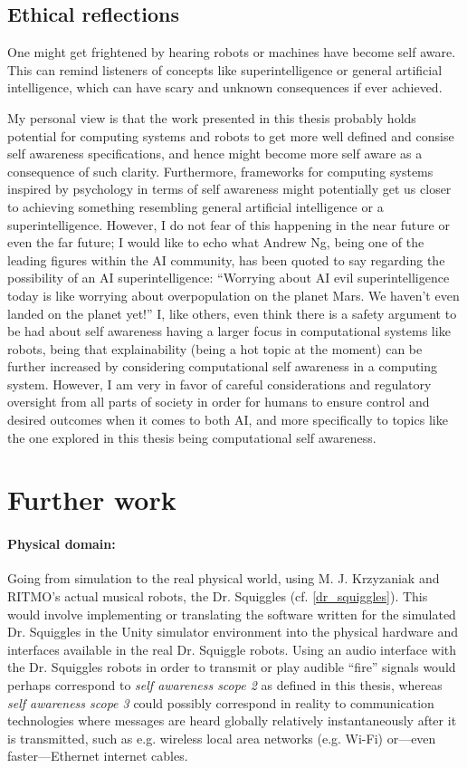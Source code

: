 	\subsection{Ethical reflections}
	
	One might get frightened by hearing robots or machines have become self aware. This can remind listeners of concepts like superintelligence or general artificial intelligence, which can have scary and unknown consequences if ever achieved.
	
	My personal view is that the work presented in this thesis probably holds potential for computing systems and robots to get more well defined and consise self awareness specifications, and hence might become more self aware as a consequence of such clarity. Furthermore, frameworks for computing systems inspired by psychology in terms of self awareness might potentially get us closer to achieving something resembling general artificial intelligence or a superintelligence. However, I do not fear of this happening in the near future or even the far future; I would like to echo what Andrew Ng, being one of the leading figures within the AI community, has been quoted to say regarding the possibility of an AI superintelligence: ``Worrying about AI evil superintelligence today is like worrying about overpopulation on the planet Mars. We haven’t even landed on the planet yet!'' I, like others, even think there is a safety argument to be had about self awareness having a larger focus in computational systems like robots, being that explainability (being a hot topic at the moment) can be further increased by considering computational self awareness in a computing system. However, I am very in favor of careful considerations and regulatory oversight from all parts of society in order for humans to ensure control and desired outcomes when it comes to both AI, and more specifically to topics like the one explored in this thesis being computational self awareness.


\section{Further work}

	\paragraph{Physical domain:}
	Going from simulation to the real physical world, using M. J. Krzyzaniak and RITMO's  actual musical robots, the Dr. Squiggles (cf. \ref{dr_squiggles}). This would involve implementing or translating the software written for the simulated Dr. Squiggles in the Unity simulator environment into the physical hardware and interfaces available in the real Dr. Squiggle robots. Using an audio interface with the Dr. Squiggles robots in order to transmit or play audible ``fire'' signals would perhaps correspond to \textit{self awareness scope 2} as defined in this thesis, whereas \textit{self awareness scope 3} could possibly correspond in reality to communication technologies where messages are heard globally relatively instantaneously after it is transmitted, such as e.g. wireless local area networks (e.g. Wi-Fi) or—even faster—Ethernet internet cables.

